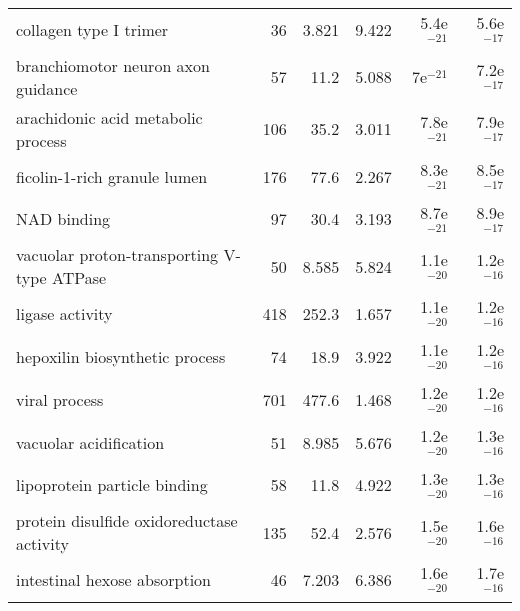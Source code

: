 \begin{longtable}{lrrrrr}
                            collagen type I trimer &                      36 &                   3.821 &      9.422 &         5.4e$^{-21}$ &         5.6e$^{-17}$ \\
                branchiomotor neuron axon guidance &                      57 &                    11.2 &      5.088 &           7e$^{-21}$ &         7.2e$^{-17}$ \\
                arachidonic acid metabolic process &                     106 &                    35.2 &      3.011 &         7.8e$^{-21}$ &         7.9e$^{-17}$ \\
                      ficolin-1-rich granule lumen &                     176 &                    77.6 &      2.267 &         8.3e$^{-21}$ &         8.5e$^{-17}$ \\
                                       NAD binding &                      97 &                    30.4 &      3.193 &         8.7e$^{-21}$ &         8.9e$^{-17}$ \\
        vacuolar proton-transporting V-type ATPase &                      50 &                   8.585 &      5.824 &         1.1e$^{-20}$ &         1.2e$^{-16}$ \\
                                   ligase activity &                     418 &                   252.3 &      1.657 &         1.1e$^{-20}$ &         1.2e$^{-16}$ \\
                    hepoxilin biosynthetic process &                      74 &                    18.9 &      3.922 &         1.1e$^{-20}$ &         1.2e$^{-16}$ \\
                                     viral process &                     701 &                   477.6 &      1.468 &         1.2e$^{-20}$ &         1.2e$^{-16}$ \\
                            vacuolar acidification &                      51 &                   8.985 &      5.676 &         1.2e$^{-20}$ &         1.3e$^{-16}$ \\
                      lipoprotein particle binding &                      58 &                    11.8 &      4.922 &         1.3e$^{-20}$ &         1.3e$^{-16}$ \\
         protein disulfide oxidoreductase activity &                     135 &                    52.4 &      2.576 &         1.5e$^{-20}$ &         1.6e$^{-16}$ \\
                      intestinal hexose absorption &                      46 &                   7.203 &      6.386 &         1.6e$^{-20}$ &         1.7e$^{-16}$ \\

\end{longtable}
